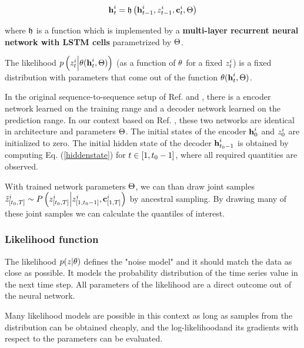 \documentclass[11pt,headings=small]{scrartcl}
\begin{document}
\begin{equation}\label{hiddenstate}
\textbf{h}_{t}^{i} =  \frak{h} \left(\textbf{h}^{i}_{t-1},z^{i}_{t-1},\textbf{c}^{i}_{t},\Theta   \right)
\end{equation}

where $\frak{h}$ is a function which is implemented by a \textbf{multi-layer recurrent neural network with LSTM cells} parametrized by $\Theta$.

The likelihood $p \left( z^{i}_{t} \Big| \theta(\textbf{h}_{t}^{i},\Theta) \right)$ (as a function of $\theta$ for a fixed $z^{i}_{t}$) is a fixed distribution with parameters that come out of the function $\theta(\textbf{h}_{t}^{i},\Theta)$.

In the original sequence-to-sequence setup of Ref. \cite{DBLP:journals/corr/Graves13} and \cite{DBLP:journals/corr/SutskeverVL14}, there is a encoder network learned on the training range and a decoder network learned on the prediction range. In our context based on Ref. \cite{SALINAS20201181}, these two networks are identical in architecture and parameters $\Theta$.  The initial states of the encoder $\textbf{h}^{i}_{0}$ and $z^{i}_{0}$ are initialized to zero. The initial hidden state of the decoder $\textbf{h}^{i}_{t_{0}-1}$ is obtained by computing Eq. (\ref{hiddenstate}) for $t\in[1,t_{0}-1]$, where all required quantities are observed.

With trained network parameters $\Theta$, we can than draw joint samples $\tilde{z}^{i}_{[t_{0},T]} \sim P \left( z^{i}_{[t_{0},T]} \Big| z^{i}_{[1,t_{0}-1]} , \textbf{c}^{i}_{[1,T]} \right)$ by ancestral sampling. By drawing many of these joint samples we can calculate the quantiles of interest. 


\subsubsection{Likelihood function}
\label{subsubsection:App1likelyhood}

The likelihood $p(z|\theta)$ defines the "noise model" and it should match the data as close as possible. It models the probability distribution of the time series value in the next time step. All parameters  of the likelihood are a direct outcome out of the neural network.

Many likelihood models are possible in this context as long as samples from the distribution can be obtained cheaply, and the log-likelihoodand its gradients with respect to the parameters can be evaluated.
\end{document}

